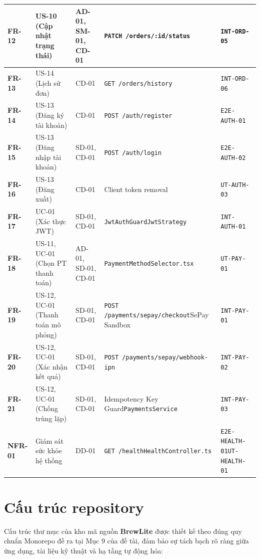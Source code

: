 \documentclass[a4paper]{article}
\begin{document}
\begin{longtable}{|>{\centering\arraybackslash}p{}|>{\centering\arraybackslash}p{}|>{\centering\arraybackslash}p{}|p{}|p{}|}
\hline
\textbf{FR-12} & US-10 (Cập nhật trạng thái) & AD-01, SM-01, CD-01 & \texttt{PATCH /orders/:id/status} & \texttt{INT-ORD-05} \\
\hline
\textbf{FR-13} & US-14 (Lịch sử đơn) & CD-01 & \texttt{GET /orders/history} & \texttt{INT-ORD-06} \\
\hline
\textbf{FR-14} & US-13 (Đăng ký tài khoản) & CD-01 & \texttt{POST /auth/register} & \texttt{E2E-AUTH-01} \\
\hline
\textbf{FR-15} & US-13 (Đăng nhập tài khoản) & SD-01, CD-01 & \texttt{POST /auth/login} & \texttt{E2E-AUTH-02} \\
\hline
\textbf{FR-16} & US-13 (Đăng xuất) & CD-01 & Client token removal & \texttt{UT-AUTH-03} \\
\hline
\textbf{FR-17} & UC-01 (Xác thực JWT) & SD-01, CD-01 & \texttt{JwtAuthGuard}\newline\texttt{JwtStrategy} & \texttt{INT-AUTH-01} \\
\hline
\textbf{FR-18} & US-11, UC-01 (Chọn PT thanh toán) & AD-01, SD-01, CD-01 & \texttt{PaymentMethodSelector.tsx} & \texttt{UT-PAY-01} \\
\hline
\textbf{FR-19} & US-12, UC-01 (Thanh toán mô phỏng) & SD-01, CD-01 & \texttt{POST /payments/sepay/checkout}\newline SePay Sandbox & \texttt{INT-PAY-01} \\
\hline
\textbf{FR-20} & US-12, UC-01 (Xác nhận kết quả) & SD-01, CD-01 & \texttt{POST /payments/sepay/webhook-ipn} & \texttt{INT-PAY-02} \\
\hline
\textbf{FR-21} & US-12, UC-01 (Chống trùng lặp) & SD-01, CD-01 & Idempotency Key Guard\newline\texttt{PaymentsService} & \texttt{INT-PAY-03} \\
\hline
\textbf{NFR-01} & Giám sát sức khỏe hệ thống & DD-01 & \texttt{GET /health}\newline\texttt{HealthController.ts} & \texttt{E2E-HEALTH-01}\newline\texttt{UT-HEALTH-01} \\
\hline
\end{longtable}
\setlength{\tabcolsep}{6pt}

\section{Cấu trúc repository}

Cấu trúc thư mục của kho mã nguồn \textbf{BrewLite} được thiết kế theo đúng quy chuẩn Monorepo đề ra tại Mục 9 của đề tài, đảm bảo sự tách bạch rõ ràng giữa ứng dụng, tài liệu kỹ thuật và hạ tầng tự động hóa:
\end{document}
